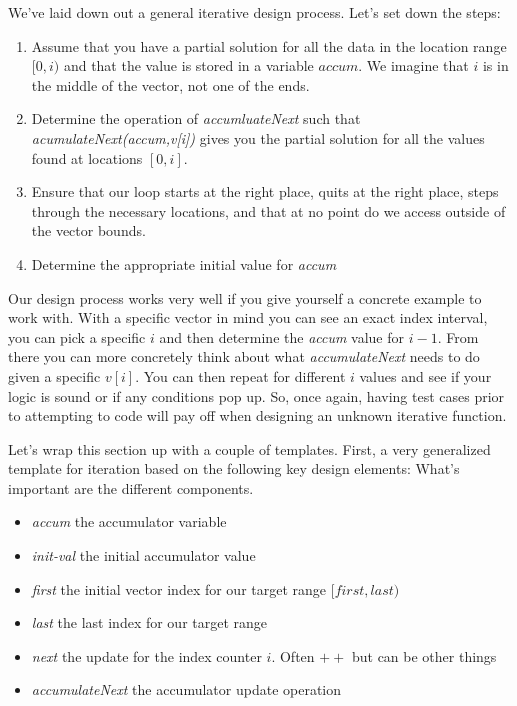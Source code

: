\documentclass[]{tufte-handout}
\begin{document}
We've laid down out a general iterative design process. Let's set down the steps:
\begin{enumerate}
\item Assume that you have a partial solution for all the data in the location range $[0,i)$ and that the value is stored in a variable $accum$.  We imagine that $i$ is in the middle of the vector, not one of the ends.
\item Determine the operation of \textit{accumluateNext} such that \textit{acumulateNext(accum,v[i])} gives you the partial solution for all the values found at locations $[0,i]$.
\item Ensure that our loop starts at the right place, quits at the right place, steps through the necessary locations, and that at no point do we access outside of the vector bounds.
\item Determine the appropriate initial value for \textit{accum}
\end{enumerate}
Our design process works very well if you give yourself a concrete example to work with. With a specific vector in mind you can see an exact index interval, you can pick a specific $i$ and then determine the \textit{accum} value for $i-1$. From there you can more concretely think about what \textit{accumulateNext} needs to do given a specific $v[i]$. You can then repeat for different $i$ values and see if your logic is sound or if any conditions pop up. So, once again, having test cases prior to attempting to code will pay off when designing an unknown iterative function.  


Let's wrap this section up with a couple of templates.  First, a very generalized template for iteration based on the following key design elements:
 What's important are the different components.
\begin{itemize}
\item \textit{accum} the accumulator variable
\item \textit{init-val} the initial accumulator value
\item \textit{first} the initial vector index for our target range $[first,last)$
\item \textit{last} the last index for our target range
\item \textit{next} the update for the index counter $i$. Often $++$ but can be other things
\item \textit{accumulateNext} the accumulator update operation
\end{itemize}
\end{document}
